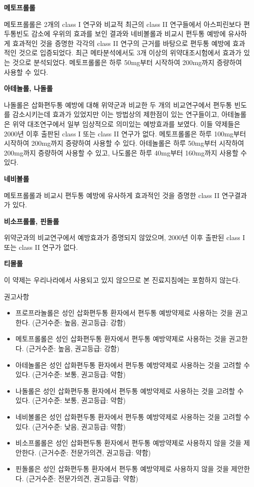 \documentclass[]{book}
\begin{document}
\textbf{메토프롤롤}

메토프롤롤은 2개의 class I 연구와 비교적 최근의 class II 연구들에서 아스피린보다 편두통빈도 감소에 우위의 효과를 보인 결과와 네비볼롤과 비교시 편두통 예방에 유사하게 효과적인 것을 증명한 각각의 class II 연구의 근거를 바탕으로 편두통 예방에 효과적인 것으로 입증되었다. 최근 메타분석에서도 3개 이상의 위약대조시험에서 효과가 있는 것으로 분석되었다. 메토프롤롤은 하루 50mg부터 시작하여 200mg까지 증량하여 사용할 수 있다.

\textbf{아테놀롤, 나돌롤}

나돌롤은 삽화편두통 예방에 대해 위약군과 비교한 두 개의 비교연구에서 편두통 빈도를 감소시키는데 효과가 있었지만 이는 방법상의 제한점이 있는 연구들이고, 아테놀롤은 위약 대조연구에서 일부 임상적으로 의미있는 예방효과를 보였다. 이들 약제들은 2000년 이후 출판된 class I 또는 class II 연구가 없다. 메토프롤롤은 하루 100mg부터 시작하여 200mg까지 증량하여 사용할 수 있다. 아테놀롤은 하루 50mg부터 시작하여 200mg까지 증량하여 사용할 수 있고, 나도롤은 하루 40mg부터 160mg까지 사용할 수 있다.

\textbf{네비볼롤}

메토프롤롤과 비교시 편두통 예방에 유사하게 효과적인 것을 증명한 class II 연구결과가 있다.

\textbf{비소프롤롤, 핀돌롤}

위약군과의 비교연구에서 예방효과가 증명되지 않았으며, 2000년 이후 출판된 class I 또는 class II 연구가 없다.

\textbf{티몰롤}

이 약제는 우리나라에서 사용되고 있지 않으므로 본 진료지침에는 포함하지 않는다.

권고사항

\begin{itemize}
\item
  프로프라놀롤은 성인 삽화편두통 환자에서 편두통 예방약제로 사용하는 것을 권고한다. (근거수준: 높음, 권고등급: 강함)
\item
  메토프롤롤은 성인 삽화편두통 환자에서 편두통 예방약제로 사용하는 것을 권고한다. (근거수준: 높음, 권고등급: 강함)
\item
  아테놀롤은 성인 삽화편두통 환자에서 편두통 예방약제로 사용하는 것을 고려할 수 있다. (근거수준: 보통, 권고등급: 약함)
\item
  나돌롤은 성인 삽화편두통 환자에서 편두통 예방약제로 사용하는 것을 고려할 수 있다. (근거수준: 보통, 권고등급: 약함)
\item
  네비볼롤은 성인 삽화편두통 환자에서 편두통 예방약제로 사용하는 것을 고려할 수 있다. (근거수준: 낮음, 권고등급: 약함)
\item
  비소프롤롤은 성인 삽화편두통 환자에서 편두통 예방약제로 사용하지 않을 것을 제안한다. (근거수준: 전문가의견, 권고등급: 약함)
\item
  핀돌롤은 성인 삽화편두통 환자에서 편두통 예방약제로 사용하지 않을 것을 제안한다. (근거수준: 전문가의견, 권고등급: 약함)
\end{itemize}
\end{document}
